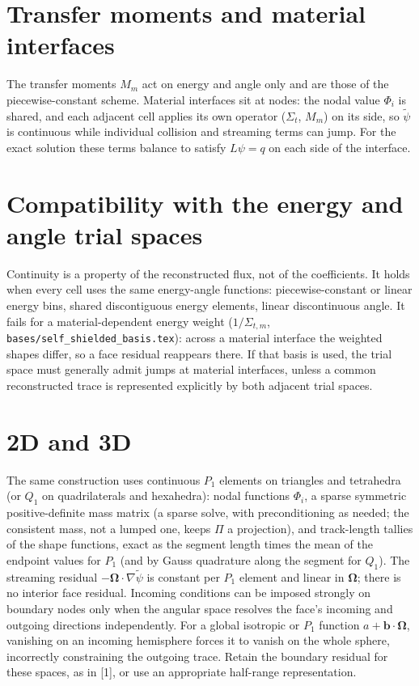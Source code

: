 \documentclass[11pt]{article}
\newcommand{\tpsi}{\tilde\psi}
\newcommand{\Sigt}{\Sigma_t}
\begin{document}
\section{Transfer moments and material interfaces}

The transfer moments $M_{m}$ act on energy and angle only and are those of the
piecewise-constant scheme. Material interfaces sit at nodes: the nodal value
$\Phi_i$ is shared, and each adjacent cell applies its own operator ($\Sigt$,
$M_m$) on its side, so $\tpsi$ is continuous while individual collision and
streaming terms can jump. For the exact solution these terms balance to satisfy
$L\psi=q$ on each side of the interface.

\section{Compatibility with the energy and angle trial spaces}

Continuity is a property of the reconstructed flux, not of the coefficients. It holds
when every cell uses the same energy-angle functions: piecewise-constant or linear
energy bins, shared discontiguous energy elements, linear discontinuous angle. It fails
for a material-dependent energy weight ($1/\Sigma_{t,m}$,
\texttt{bases/self\_shielded\_basis.tex}): across a material interface the weighted shapes
differ, so a face residual reappears there. If that basis is used, the trial space must
generally admit jumps at material interfaces, unless a common reconstructed
trace is represented explicitly by both adjacent trial spaces.

\section{2D and 3D}

The same construction uses continuous $P_1$ elements on triangles and tetrahedra (or
$Q_1$ on quadrilaterals and hexahedra): nodal functions $\Phi_i$, a sparse symmetric
positive-definite mass matrix (a sparse solve, with preconditioning as needed;
the consistent mass, not a lumped one, keeps $\Pi$ a projection), and track-length
tallies of the shape functions, exact as the segment length times the mean of the
endpoint values for $P_1$ (and by Gauss quadrature along the segment for $Q_1$). The
streaming residual $-\boldsymbol\Omega\cdot\nabla\tpsi$ is constant per $P_1$ element
and linear in $\boldsymbol\Omega$; there is no interior face residual.
Incoming conditions can be imposed strongly on boundary nodes only when the
angular space resolves the face's incoming and outgoing directions independently.
For a global isotropic or $P_1$ function $a+\mathbf b\cdot\boldsymbol\Omega$,
vanishing on an incoming hemisphere forces it to vanish on the whole sphere,
incorrectly constraining the outgoing trace. Retain the boundary residual for
these spaces, as in [1], or use an appropriate half-range representation.
\end{document}
